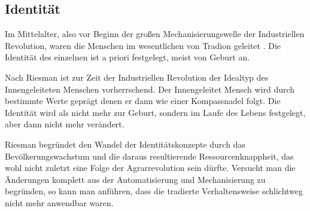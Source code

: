 \subsection{Identität}

Im Mittelalter, also vor Beginn der großen Mechanisierungswelle der Industriellen Revolution, waren die Menschen im wesentlichen von Tradion geleitet \parencite{riessman}.
Die Identität des einzelnen ist a priori festgelegt, meist von Geburt an\parencite{rosa}.

Nach Riesman ist zur Zeit der Industriellen Revolution der Idealtyp des Innengeleiteten Menschen vorherrschend. Der Innengeleitet Mensch wird durch bestimmte Werte geprägt denen er dann wie einer Kompassnadel folgt.
Die Identität wird als nicht mehr zur Geburt, sondern im Laufe des Lebens festgelegt, aber dann nicht mehr verändert.

Riesman begründet den Wandel der Identitätskonzepte durch das Bevölkerungswachstum und die daraus resultierende Ressourcenknappheit, das wohl nicht zuletzt eine Folge der Agrarrevolution sein dürfte.
Versucht man die Änderungen komplett aus der Automatisierung und Mechanisierung zu begründen, so kann man anführen, dass die tradierte Verhaltensweise schlichtweg nicht mehr anwendbar waren. 
